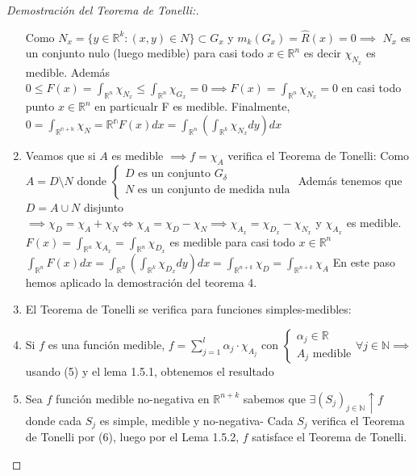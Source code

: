 \begin{proof}[Demostración del Teorema de Tonelli:]
\begin{enumerate}
        Como $N_x = \{y \in \mathbb{R}^k : (x,y) \in N\} \subset G_x$ y $m_k(G_x) = \widehat{R}(x) = 0 \implies$ $N_x$ es un conjunto nulo (luego medible) para casi todo $x \in \mathbb{R}^n$ es decir $\chi_{N_x}$ es medible. 
        Además $0 \leq F(x) = \int_{\mathbb{R}^n} \chi_{N_x} \leq \int_{\mathbb{R}^n}\chi_{G_x} = 0 \implies F(x) = \int_{\mathbb{R}^n}\chi_{N_x} = 0$ en casi todo punto $x \in \mathbb{R}^n$ en particualr F es medible. 
        Finalmente, $0 = \int_{\mathbb{R^{n+k}}} \chi_N = \mathbb{R^n}F(x) dx = \int_{\mathbb{R}^n}(\int_{\mathbb{R}^k}\chi_{N_x}dy)dx$
        \item Veamos que si $A$ es medible $\implies f = \chi_A$ verifica el Teorema de Tonelli: Como $A = D \setminus N$ donde $\begin{cases}
            D \text{ es un conjunto } G_{\delta} \\
            N \text{ es un conjunto de medida nula}
        \end{cases}$ Además tenemos que $D = A \cup N$ disjunto $\implies \chi_D = \chi_A + \chi_N \iff \chi_A = \chi_D - \chi_N \implies \chi_{A_x} = \chi_{D_x} - \chi_{N_x}$ y $\chi_{A_x}$ es medible. \\
        $F(x) = \int_{\mathbb{R}^n}\chi_{A_x} = \int_{\mathbb{R}^n}\chi_{D_x}$ es medible para casi todo $x \in \mathbb{R}^n$
        $\int_{\mathbb{R}^n}F(x)dx = \int_{\mathbb{R}^n}(\int_{\mathbb{R}^k}\chi_{D_x}dy)dx = \int_{\mathbb{R}^{n+k}}\chi_D = \int_{\mathbb{R}^{n+k}}\chi_A$ En este paso hemos aplicado la demostración del teorema 4. 
        \item El Teorema de Tonelli se verifica para funciones simples-medibles: 
        \item Si $f$ es una función medible, $f = \sum_{j = 1}^l \alpha_j \cdot \chi_{A_j}$ con $\begin{cases}
            \alpha_j \in \mathbb{R} \\
            A_j \text{ medible}
        \end{cases} \forall j \in \mathbb{N} \implies$ usando (5) y el lema 1.5.1, obtenemos el resultado
        \item Sea $f$ función medible no-negativa en $\mathbb{R}^{n+k}$ sabemos que $\exists (S_j)_{j \in \mathbb{N}} \uparrow f$ donde cada $S_j$ es simple, medible y no-negativa- Cada $S_j$ verifica el Teorema de Tonelli por (6), luego por el Lema 1.5.2, $f$ satisface el Teorema de Tonelli.
    \end{enumerate}
\end{proof}


